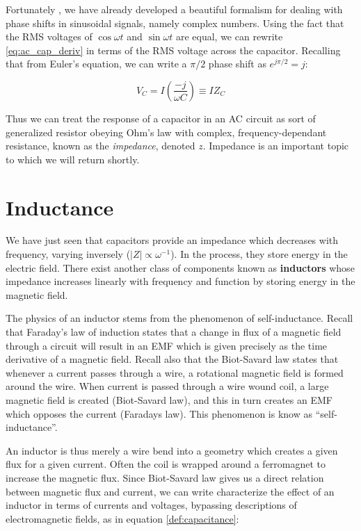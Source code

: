 \documentclass{tufte-book}
\begin{document}
Fortunately , we have already developed a beautiful formalism for dealing with phase shifts in sinusoidal signals, namely complex numbers. Using the fact that the RMS voltages of $\cos\omega t$ and $\sin\omega t$ are equal, we can rewrite \ref{eq:ac_cap_deriv} in terms of the RMS voltage across the capacitor. Recalling that from Euler's equation, we can write a $\pi/2$ phase shift as $e^{j\pi/2} = j$:

\begin{equation}\label{eq:cap_impedance}
V_C = I\left(\frac{-j}{\omega C}\right) \equiv IZ_C
\end{equation}

Thus we can treat the response of a capacitor in an AC circuit as sort of generalized resistor obeying Ohm's law with complex, frequency-dependant resistance, known as the \textit{impedance}, denoted $z$. Impedance is an important topic to which we will return shortly.

\section{Inductance}
We have just seen that capacitors provide an impedance which decreases with frequency, varying inversely ($\vert Z \vert \propto \omega^{-1}$). In the process, they store energy in the electric field. There exist another class of components known as \textbf{inductors} whose impedance increases linearly with frequency and function by storing energy in the magnetic field.

The physics of an inductor stems from the phenomenon of self-inductance. Recall that Faraday's law of induction states that a change in flux of a magnetic field through a circuit will result in an EMF which is given precisely as the time derivative of a magnetic field. Recall also that the Biot-Savard law states that whenever a current passes through a wire, a rotational magnetic field is formed around the wire. When current is passed through a wire wound coil, a large magnetic field is created (Biot-Savard law), and this in turn creates an EMF which opposes the current (Faradays law). This phenomenon is know as ``self-inductance''.

An inductor is thus merely a wire bend into a geometry which creates a given flux for a given current. Often the coil is wrapped around a ferromagnet to increase the magnetic flux. Since Biot-Savard law gives us a direct relation between magnetic flux and current, we can write characterize the effect of an inductor in terms of currents and voltages, bypassing descriptions of electromagnetic fields, as in equation \ref{def:capacitance}:
\end{document}
